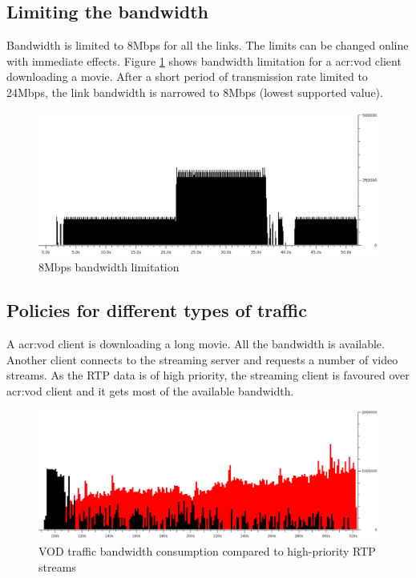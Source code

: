 \documentclass[11pt]{book}
\begin{document}
      \subsection{Limiting the bandwidth}
      \label{sub:uc:limit}

        Bandwidth is limited to 8Mbps for all the links. The limits can be changed online with immediate effects. Figure
        \ref{fig:uc:limit} shows bandwidth limitation for a \gls{acr:vod} client downloading a movie. After a short period of
        transmission rate limited to 24Mbps, the link bandwidth is narrowed to 8Mbps (lowest supported value).

        \begin{figure}[H]
          \begin{center}
            \includegraphics[width=.7\textwidth]{img/test-case/limit.png}
          \end{center}

          \caption{8Mbps bandwidth limitation}
          \label{fig:uc:limit}
        \end{figure}


      \subsection{Policies for different types of traffic}
      \label{sub:uc:traffic}

        A \gls{acr:vod} client is downloading a long movie. All the bandwidth is available. Another client connects to the
        streaming server and requests a number of video streams. As the RTP data is of high priority, the streaming
        client is favoured over \gls{acr:vod} client and it gets most of the available bandwidth.

        \begin{figure}[H]
          \begin{center}
            \includegraphics[width=.7\textwidth]{img/test-case/vod-rtp.png}
          \end{center}

          \caption{VOD traffic bandwidth consumption compared to high-priority RTP streams}
        \end{figure}
\end{document}
